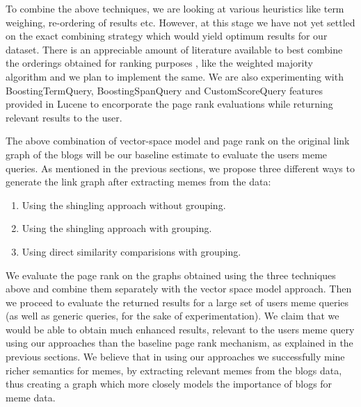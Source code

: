 \documentclass{acm_proc_article-sp}
\begin{document}
To combine the above techniques, we are looking at various heuristics like term weighing, re-ordering of results etc. However, at this stage we have not yet settled on the exact combining strategy which would yield optimum results for our dataset. There is an appreciable amount of literature available to best combine the orderings obtained for ranking purposes \cite{littlestone1989weighted}, like the weighted majority algorithm and we plan to implement the same. We are also experimenting with BoostingTermQuery, BoostingSpanQuery and CustomScoreQuery features provided in Lucene to encorporate the page rank evaluations while returning relevant results to the user.

The above combination of vector-space model and page rank on the original link graph of the blogs will be our baseline estimate to evaluate the users meme queries. As mentioned in the previous sections, we propose three different ways to generate the link graph after extracting memes from the data:
\begin{enumerate}
\item Using the shingling approach without grouping.
\item Using the shingling approach with grouping.
\item Using direct similarity comparisions with grouping.
\end{enumerate}

We evaluate the page rank on the graphs obtained using the three techniques above and combine them separately with the vector space model approach. Then we proceed to evaluate the returned results for a large set of users meme queries (as well as generic queries, for the sake of experimentation). We claim that we would be able to obtain much enhanced results, relevant to the users meme query using our approaches than the baseline page rank mechanism, as explained in the previous sections. We believe that in using our approaches we successfully mine richer semantics for memes, by extracting relevant memes from the blogs data, thus creating a graph which more closely models the importance of blogs for meme data.
\end{document}
